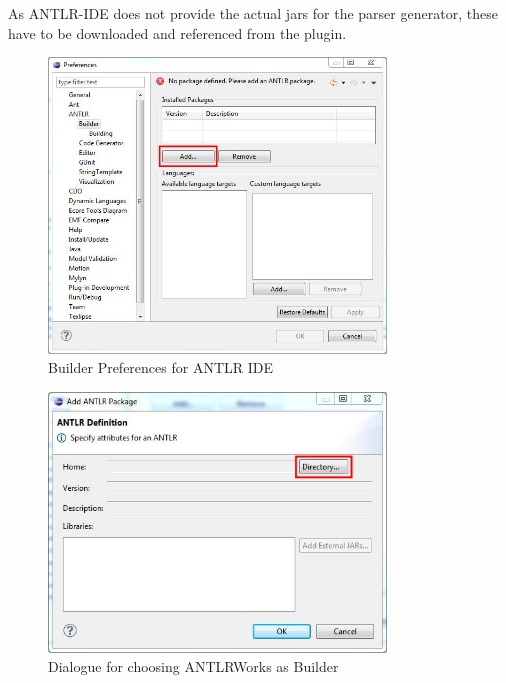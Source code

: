 \begin{enumerate}
As ANTLR-IDE does not provide the actual jars for the parser generator, these have to be downloaded and referenced from the plugin.
\begin{figure}[!htbp]
\begin{center}
 \includegraphics[width=0.8\textwidth]{pics/moca/0Install/1-antlr-package}
  \caption{Builder Preferences for ANTLR IDE}
  \label{moca-1-antlr-package}
\end{center}
\end{figure}
\begin{figure}[!htbp]
\begin{center}
 \includegraphics[width=0.8\textwidth]{pics/moca/0Install/2-choose-path-to-jar}
  \caption{Dialogue for choosing ANTLRWorks as Builder}
  \label{moca-2-choose-path-to-jar}
\end{center}
\end{figure}
\end{enumerate}

\clearpage